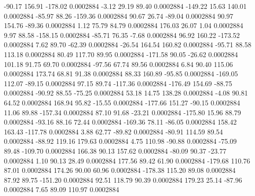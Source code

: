       -90.17      156.91     -178.02     0.0002884
       -3.12       29.19       89.40     0.0002884
     -149.22       15.63      140.01     0.0002884
      -85.97       88.26     -159.36     0.0002884
       90.67       26.74      -89.04     0.0002884
       90.97      154.76      -89.36     0.0002884
        1.12       75.79       84.79     0.0002884
      176.03       26.07        1.04     0.0002884
        9.97       88.58     -158.15     0.0002884
      -85.71       76.35       -7.68     0.0002884
       96.92      160.22     -173.52     0.0002884
        7.62       89.70      -62.39     0.0002884
      -26.54      164.54      160.82     0.0002884
      -95.71       88.58      113.18     0.0002884
       80.49      117.70       89.95     0.0002884
     -171.58       90.05      -26.62     0.0002884
      101.18       91.75       69.70     0.0002884
      -97.56       67.74       89.56     0.0002884
        6.84       90.40      115.06     0.0002884
      173.74       68.81       91.38     0.0002884
       88.33      160.89      -95.85     0.0002884
     -169.05      112.07      -89.15     0.0002884
       97.15       89.74     -117.36     0.0002884
     -176.49      154.69      -88.75     0.0002884
      -90.92       88.55      -75.25     0.0002884
       53.18       14.75      138.28     0.0002884
       -4.08       90.81       64.52     0.0002884
      168.94       95.82      -15.55     0.0002884
     -177.66      151.27      -90.15     0.0002884
       11.06       89.88     -157.34     0.0002884
       87.10       91.68      -23.21     0.0002884
     -175.80       15.96       88.79     0.0002884
      -93.16       88.16       72.44     0.0002884
     -169.36       78.11      -86.05     0.0002884
      158.42      163.43     -117.78     0.0002884
        3.88       62.77      -89.82     0.0002884
      -80.91      114.59       89.54     0.0002884
      -88.92      119.16      179.63     0.0002884
        4.75      110.98      -90.88     0.0002884
      -75.09       89.48     -109.70     0.0002884
      166.38       90.13      157.62     0.0002884
      -80.09       90.37      -23.77     0.0002884
        1.10       90.13       28.49     0.0002884
      177.56       89.42       61.90     0.0002884
     -179.68      110.76       87.01     0.0002884
      174.26       90.00       60.96     0.0002884
     -178.38      115.20       89.08     0.0002884
       87.92       89.75     -151.20     0.0002884
       92.51      118.79       90.39     0.0002884
      179.23       25.14      -87.96     0.0002884
        7.65       89.09      110.97     0.0002884
